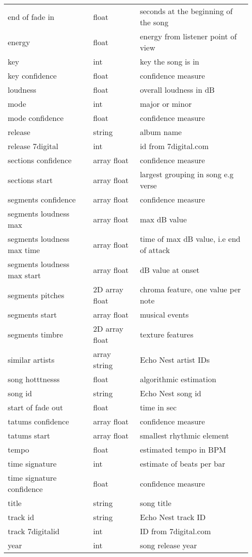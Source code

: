 \begin{longtable}[c]{l|l|l}
end of fade in & float & seconds at the beginning of the song\\
energy & float & energy from listener point of view\\
key & int & key the song is in\\
key confidence & float & confidence measure\\
loudness & float & overall loudness in dB\\
mode & int & major or minor\\
mode confidence & float & confidence measure\\
release & string & album name\\
release 7digital & int & id from 7digital.com\\
sections confidence & array float & confidence measure\\
sections start & array float & largest grouping in song e.g verse\\
segments confidence & array float & confidence measure\\
segments loudness max & array float & max dB value\\
segments loudness max time & array float & time of max dB value, i.e end of attack\\
segments loudness max start & array float & dB value at onset\\
segments pitches & 2D array float & chroma feature, one value per note\\
segments start & array float & musical events\\
segments timbre & 2D array float & texture features\\
similar artists & array string & Echo Nest artist IDs\\
song hotttnesss & float & algorithmic estimation\\
song id & string & Echo Nest song id\\
start of fade out & float & time in sec\\
tatums confidence & array float & confidence measure\\
tatums start & array float & smallest rhythmic element\\
tempo & float & estimated tempo in BPM\\
time signature & int & estimate of beats per bar\\
time signature confidence & float & confidence measure\\
title & string & song title\\
track id & string & Echo Nest track ID\\
track 7digitalid & int & ID from 7digital.com\\
year & int & song release year

\end{longtable}

